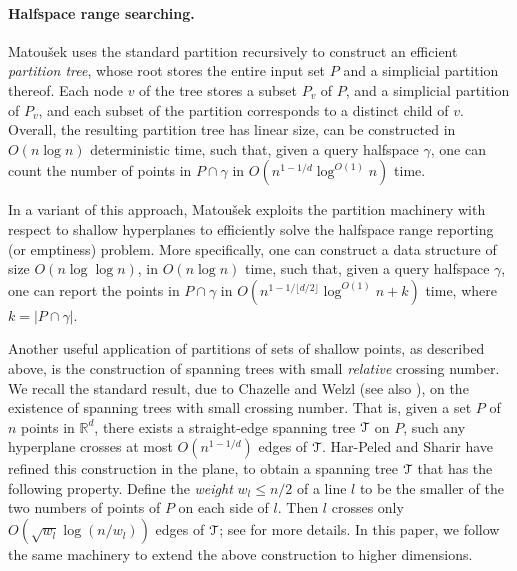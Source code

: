 \documentclass[11pt]{article}
\newcommand{\Tree}{\EuScript{T}}
\def\reals{\mathbb R}
\begin{document}
\paragraph{Halfspace range searching.} Matou\v{s}ek \cite{mat92a} uses the standard partition recursively to construct an efficient {\em partition tree},
whose root stores the entire input set $P$ and a simplicial partition thereof. Each node $v$ of the tree stores a subset $P_{v}$ of $P$, and a simplicial
partition of $P_{v}$, and each subset of the partition corresponds to a distinct child of $v$. Overall, the resulting partition tree has linear size, can be
constructed in $O(n \log n)$ deterministic time, such that, given a query halfspace $\gamma$, one can count the number of points in $P \cap \gamma $ in
$O(n^{1-1/d} \log^{O(1)}n)$ time.

In a variant of this approach, Matou\v{s}ek \cite{mat92b} exploits the partition machinery with respect to shallow hyperplanes to efficiently solve the
halfspace range reporting (or emptiness) problem. More specifically, one can construct a data structure of size $O(n \log \log n)$, in $O(n \log n)$ time,
such that, given a query halfspace $\gamma$, one can report the points in $P \cap \gamma$ in $O(n^{1-1/\lfloor d/2 \rfloor}\log^{O(1)}n + k)$ time,
where $k = |P \cap \gamma|$.

Another useful application of partitions of sets of shallow points, as described above, is the construction of spanning trees with small {\em relative}
crossing number. We recall the standard result, due to Chazelle and Welzl \cite{cw89} (see also \cite{wel92}), on the existence of spanning trees with small
crossing number. That is, given a set $P$ of $n$ points in $\reals^{d}$, there exists a straight-edge spanning tree $\Tree$ on $P$, such any hyperplane
crosses at most $O(n^{1-1/d})$ edges of $\Tree$. Har-Peled and Sharir have refined this construction in the plane, to obtain a spanning tree $\Tree$ that
has the following property. Define the {\em weight} $w_{l} \leq n/2$ of a line $l$ to be the smaller of the two numbers of points of $P$ on each side of
$l$. Then $l$ crosses only $O(\sqrt{w_{l}}\log(n/w_{l}))$ edges of $\Tree$; see \cite{hs11} for more details. In this paper, we follow the same machinery to
extend the above construction to higher dimensions.
\end{document}
